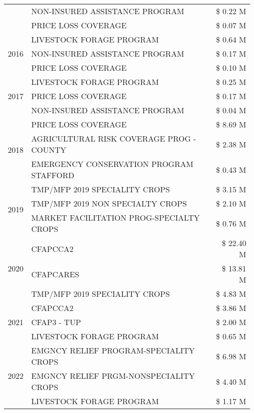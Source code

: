 \begin{tabular}{llr}
 & NON-INSURED ASSISTANCE PROGRAM & \$ 0.22 M \\
 & PRICE LOSS COVERAGE & \$ 0.07 M \\
\cline{1-3}
\multirow[t]{3}{*}{2016} & LIVESTOCK FORAGE PROGRAM & \$ 0.64 M \\
 & NON-INSURED ASSISTANCE PROGRAM & \$ 0.17 M \\
 & PRICE LOSS COVERAGE & \$ 0.10 M \\
\cline{1-3}
\multirow[t]{3}{*}{2017} & LIVESTOCK FORAGE PROGRAM & \$ 0.25 M \\
 & PRICE LOSS COVERAGE & \$ 0.17 M \\
 & NON-INSURED ASSISTANCE PROGRAM & \$ 0.04 M \\
\cline{1-3}
\multirow[t]{3}{*}{2018} & PRICE LOSS COVERAGE & \$ 8.69 M \\
 & AGRICULTURAL RISK COVERAGE PROG - COUNTY & \$ 2.38 M \\
 & EMERGENCY CONSERVATION PROGRAM STAFFORD & \$ 0.43 M \\
\cline{1-3}
\multirow[t]{3}{*}{2019} & TMP/MFP 2019 SPECIALITY CROPS & \$ 3.15 M \\
 & TMP/MFP 2019 NON SPECIALTY CROPS & \$ 2.10 M \\
 & MARKET FACILITATION PROG-SPECIALTY CROPS & \$ 0.76 M \\
\cline{1-3}
\multirow[t]{3}{*}{2020} & CFAPCCA2 & \$ 22.40 M \\
 & CFAPCARES & \$ 13.81 M \\
 & TMP/MFP 2019 SPECIALITY CROPS & \$ 4.83 M \\
\cline{1-3}
\multirow[t]{3}{*}{2021} & CFAPCCA2 & \$ 3.86 M \\
 & CFAP3 - TUP & \$ 2.00 M \\
 & LIVESTOCK FORAGE PROGRAM & \$ 0.65 M \\
\cline{1-3}
\multirow[t]{3}{*}{2022} & EMGNCY RELIEF PROGRAM-SPECIALITY CROPS & \$ 6.98 M \\
 & EMGNCY RELIEF PRGM-NONSPECIALITY CROPS & \$ 4.40 M \\
 & LIVESTOCK FORAGE PROGRAM & \$ 1.17 M \\
\cline{1-3}
\bottomrule
\end{tabular}
